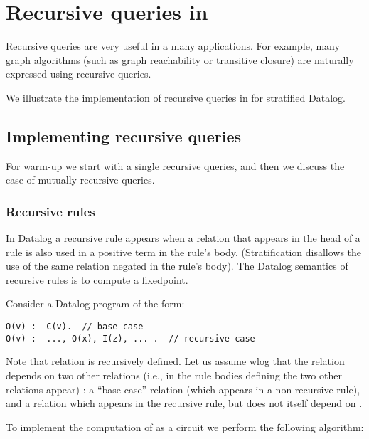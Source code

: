 \section{Recursive queries in \dbsp}\label{sec:recursive}

Recursive queries are very useful in a many applications.
For example, many graph algorithms (such as graph reachability
or transitive closure) are naturally expressed using recursive queries.

We illustrate the implementation of recursive queries in \dbsp for
stratified Datalog.

\subsection{Implementing recursive queries}

For warm-up we start with a single recursive queries, and then we discuss
the case of mutually recursive queries.

\subsubsection{Recursive rules}\label{sec:recursion}

In Datalog a recursive rule appears when a relation that appears in the head of a rule
is also used in a positive term in the rule's body.  (Stratification disallows
the use of the same relation negated in the rule's body).
The Datalog semantics of recursive rules is to compute a fixedpoint.

Consider a Datalog program of the form:

\begin{lstlisting}[language=ddlog]
O(v) :- C(v).  // base case
O(v) :- ..., O(x), I(z), ... .  // recursive case
\end{lstlisting}

Note that relation  is recursively defined.  Let us assume wlog that the 
relation depends on two other relations (i.e., in the rule bodies defining  the
two other relations appear) : a ``base case'' relation  (which appears in a
non-recursive rule), and a relation  which appears in the recursive rule, but
does not itself depend on .

To implement the computation of  as a circuit we perform the following algorithm:

